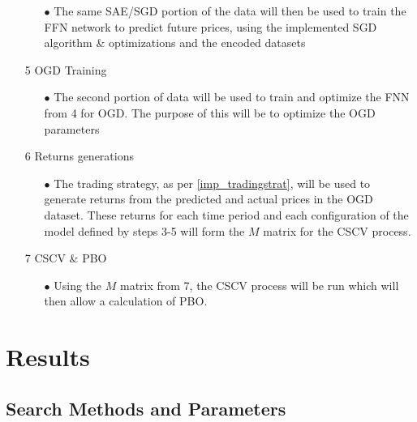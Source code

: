 \documentclass[a4paper,latin]{paper}
\begin{document}
\begin{itemize}
	\begin{itemize}
		\item[$\bullet$] The same SAE/SGD portion of the data will then be used to train the FFN network to predict future prices, using the implemented SGD algorithm \& optimizations and the encoded datasets
	\end{itemize}			
	\item [5] OGD Training
	\begin{itemize}
		\item[$\bullet$] The second portion of data will be used to train and optimize the FNN from 4 for OGD. The purpose of this will be to optimize the OGD parameters		
	\end{itemize}			
	\item [6] Returns generations
	\begin{itemize}
		\item[$\bullet$] The trading strategy, as per \ref{imp_tradingstrat}, will be used to generate returns from the predicted and actual prices in the OGD dataset. These returns for each time period and each configuration of the model defined by steps 3-5 will form the $M$ matrix for the CSCV process.
	\end{itemize}	
	\item [7] CSCV \& PBO
	\begin{itemize}
		\item[$\bullet$] Using the $M$ matrix from 7, the CSCV process will be run which will then allow a calculation of PBO.
	\end{itemize}		
\end{itemize}


\newpage
\section{Results}\label{Results}
\subsection{Search Methods and Parameters}
\end{document}
